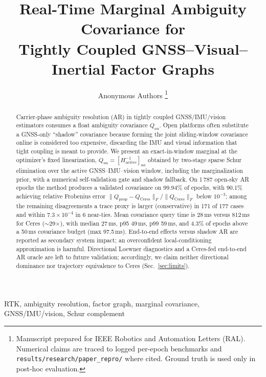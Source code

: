 \documentclass[letterpaper, journal, twocolumn]{IEEEtran}
\begin{document}
\title{Real-Time Marginal Ambiguity Covariance for\\
Tightly Coupled GNSS--Visual--Inertial Factor Graphs}

\author{Anonymous Authors
\thanks{Manuscript prepared for IEEE Robotics and Automation Letters (RAL).
Numerical claims are traced to logged per-epoch benchmarks and
\texttt{results/research/paper\_repro/} where cited.
Ground truth is used only in post-hoc evaluation.}}

\maketitle

\begin{abstract}
Carrier-phase ambiguity resolution (AR) in tightly coupled GNSS/IMU/vision
estimators consumes a float ambiguity covariance $Q_{aa}$.
Open platforms often substitute a GNSS-only ``shadow'' covariance because
forming the joint sliding-window covariance online is considered too
expensive, discarding the IMU and visual information that tight coupling is
meant to provide.
We present an exact-in-window marginal at the optimizer's fixed linearization,
$Q_{aa}=[H_{\mathrm{active}}^{-1}]_{aa}$ obtained by two-stage sparse Schur
elimination over the active GNSS--IMU--vision window, including the
marginalization prior, with a numerical self-validation gate and shadow
fallback.
On 1\,787 open-sky AR epochs the method produces a validated covariance on
99.94\% of epochs, with 90.1\% achieving relative Frobenius error
$\|Q_{\mathrm{prop}}-Q_{\mathrm{Ceres}}\|_F/\|Q_{\mathrm{Ceres}}\|_F$ below
$10^{-3}$; among the remaining disagreements a trace proxy is larger
(conservative) in 171 of 177 cases and within $7.3\times10^{-4}$ in 6
near-ties.
Mean covariance query time is 28\,ms versus 812\,ms for Ceres
($\sim$29$\times$), with median 27\,ms, p95 49\,ms, p99 59\,ms, and 4.3\% of
epochs above a 50\,ms covariance budget (max 97.5\,ms).
End-to-end effects versus shadow AR are reported as secondary system impact;
an overconfident local-conditioning approximation is harmful.
Directional Loewner diagnostics and a Ceres-fed end-to-end AR oracle are left
to future validation; accordingly, we claim neither directional dominance nor
trajectory equivalence to Ceres (Sec.~\ref{sec:limits}).
\end{abstract}

\begin{IEEEkeywords}
RTK, ambiguity resolution, factor graph, marginal covariance,
GNSS/IMU/vision, Schur complement
\end{IEEEkeywords}
\end{document}
